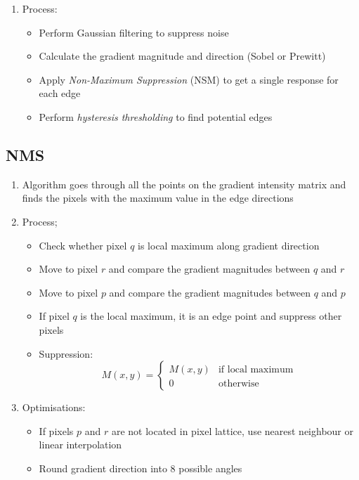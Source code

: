 \documentclass[9pt]{article}
\begin{document}
\begin{multicols*}{2}
\begin{enumerate}
            \item Process:
            \begin{itemize}
                \item Perform Gaussian filtering to suppress noise 
                \item Calculate the gradient magnitude and direction (Sobel or Prewitt)
                \item Apply \textit{Non-Maximum Suppression} (NSM) to get a single response for each edge 
                \item Perform \textit{hysteresis thresholding} to find potential edges  
            \end{itemize}
        \end{enumerate}

        \subsection{NMS}
        \begin{enumerate}
            \item Algorithm goes through all the points on the gradient intensity matrix and finds the pixels with the maximum value in the edge directions
            \item Process;
            \begin{itemize}
                \item Check whether pixel $q$ is local maximum along gradient direction 
                \item Move to pixel $r$ and compare the gradient magnitudes between $q$ and $r$ 
                \item Move to pixel $p$ and compare the gradient magnitudes between $q$ and $p$ 
                \item If pixel $q$ is the local maximum, it is an edge point and suppress other pixels 
                \item Suppression:
                $$
                    M(x,y) = \begin{cases}
                        M(x,y) & \text{if local maximum} \\
                        0 & \text{otherwise}
                    \end{cases}
                $$
            \end{itemize}

            \item Optimisations:
            \begin{itemize}
                \item If pixels $p$ and $r$ are not located in pixel lattice, use nearest neighbour or linear interpolation 
                \item Round gradient direction into 8 possible angles 
            \end{itemize}
        \end{enumerate}


\end{multicols*}
\end{document}
